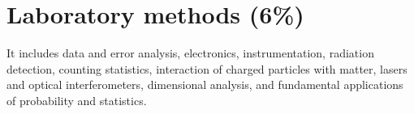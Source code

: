 
\section{Laboratory methods (6\%)}

It includes data and error analysis, electronics, instrumentation, radiation detection, counting statistics, interaction of charged particles with matter, lasers and optical interferometers, dimensional analysis, and fundamental applications of probability and statistics.

